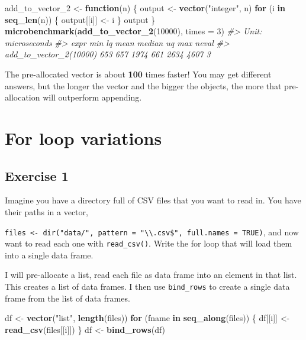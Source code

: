 \documentclass[]{book}
\newenvironment{Shaded}{\begin{snugshade}}{\end{snugshade}}
\newcommand{\CommentTok}[1]{\textcolor[rgb]{0.56,0.35,0.01}{\textit{#1}}}
\newcommand{\ControlFlowTok}[1]{\textcolor[rgb]{0.13,0.29,0.53}{\textbf{#1}}}
\newcommand{\DataTypeTok}[1]{\textcolor[rgb]{0.13,0.29,0.53}{#1}}
\newcommand{\DecValTok}[1]{\textcolor[rgb]{0.00,0.00,0.81}{#1}}
\newcommand{\KeywordTok}[1]{\textcolor[rgb]{0.13,0.29,0.53}{\textbf{#1}}}
\newcommand{\NormalTok}[1]{#1}
\newcommand{\StringTok}[1]{\textcolor[rgb]{0.31,0.60,0.02}{#1}}
\theoremstyle{definition}
\theoremstyle{definition}
\theoremstyle{definition}
\theoremstyle{remark}
\begin{document}
\begin{Shaded}
\begin{Highlighting}[]
\NormalTok{add_to_vector_}\DecValTok{2}\NormalTok{ <-}\StringTok{ }\ControlFlowTok{function}\NormalTok{(n) \{}
\NormalTok{  output <-}\StringTok{ }\KeywordTok{vector}\NormalTok{(}\StringTok{"integer"}\NormalTok{, n)}
  \ControlFlowTok{for}\NormalTok{ (i }\ControlFlowTok{in} \KeywordTok{seq_len}\NormalTok{(n)) \{}
\NormalTok{    output[[i]] <-}\StringTok{ }\NormalTok{i}
\NormalTok{  \}}
\NormalTok{  output}
\NormalTok{\}}
\KeywordTok{microbenchmark}\NormalTok{(}\KeywordTok{add_to_vector_2}\NormalTok{(}\DecValTok{10000}\NormalTok{), }\DataTypeTok{times =} \DecValTok{3}\NormalTok{)}
\CommentTok{#> Unit: microseconds}
\CommentTok{#>                    expr min  lq mean median   uq  max neval}
\CommentTok{#>  add_to_vector_2(10000) 653 657 1974    661 2634 4607     3}
\end{Highlighting}
\end{Shaded}

The pre-allocated vector is about \textbf{100} times faster! You may get
different answers, but the longer the vector and the bigger the objects,
the more that pre-allocation will outperform appending.

\hypertarget{for-loop-variations}{%
\section{For loop variations}\label{for-loop-variations}}

\hypertarget{exercise-1-53}{%
\subsection{Exercise 1}\label{exercise-1-53}}

Imagine you have a directory full of CSV files that you want to read in.
You have their paths in a vector,

\texttt{files\ \textless{}-\ dir("data/",\ pattern\ =\ "\textbackslash{}\textbackslash{}.csv\$",\ full.names\ =\ TRUE)},
and now want to read each one with \texttt{read\_csv()}. Write the for
loop that will load them into a single data frame.

I will pre-allocate a list, read each file as data frame into an element
in that list. This creates a list of data frames. I then use
\texttt{bind\_rows} to create a single data frame from the list of data
frames.

\begin{Shaded}
\begin{Highlighting}[]
\NormalTok{df <-}\StringTok{ }\KeywordTok{vector}\NormalTok{(}\StringTok{"list"}\NormalTok{, }\KeywordTok{length}\NormalTok{(files))}
\ControlFlowTok{for}\NormalTok{ (fname }\ControlFlowTok{in} \KeywordTok{seq_along}\NormalTok{(files)) \{}
\NormalTok{  df[[i]] <-}\StringTok{ }\KeywordTok{read_csv}\NormalTok{(files[[i]])}
\NormalTok{\}}
\NormalTok{df <-}\StringTok{ }\KeywordTok{bind_rows}\NormalTok{(df)}
\end{Highlighting}
\end{Shaded}
\end{document}
